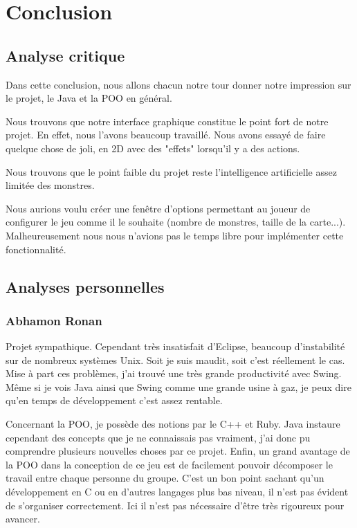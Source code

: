 \documentclass{article}
\begin{document}
\section{Conclusion}
\subsection{Analyse critique}
Dans cette conclusion, nous allons chacun notre tour donner notre impression sur le projet, le Java et la POO en général.

Nous trouvons que notre interface graphique constitue le point fort de notre projet. En effet, nous l'avons beaucoup travaillé.
Nous avons essayé de faire quelque chose de joli, en 2D avec des "effets" lorsqu'il y a des actions.

Nous trouvons que le point faible du projet reste l'intelligence artificielle assez limitée des monstres.

Nous aurions voulu créer une fenêtre d'options permettant au joueur de configurer le jeu comme il le souhaite (nombre de monstres, taille de la carte...).
Malheureusement nous nous n'avions pas le temps libre pour implémenter cette fonctionnalité.

\subsection{Analyses personnelles}
  \subsubsection{Abhamon Ronan}
  Projet sympathique. Cependant très insatisfait d'Eclipse, beaucoup d'instabilité sur de nombreux systèmes Unix.
  Soit je suis maudit, soit c'est réellement le cas.
  Mise à part ces problèmes, j'ai trouvé une très grande productivité avec Swing.
  Même si je vois Java ainsi que Swing comme une grande usine à gaz, je peux dire qu'en temps de développement c'est assez rentable. 

  Concernant la POO, je possède des notions par le C++ et Ruby.
  Java instaure cependant des concepts que je ne connaissais pas vraiment, j'ai donc pu comprendre plusieurs nouvelles choses par ce projet. 
  Enfin, un grand avantage de la POO dans la conception de ce jeu est de facilement pouvoir décomposer le travail entre chaque personne du groupe.
  C'est un bon point sachant qu'un développement en C ou en d'autres langages plus bas niveau, il n'est pas évident de s'organiser correctement.
  Ici il n'est pas nécessaire d'être très rigoureux pour avancer.
\end{document}
